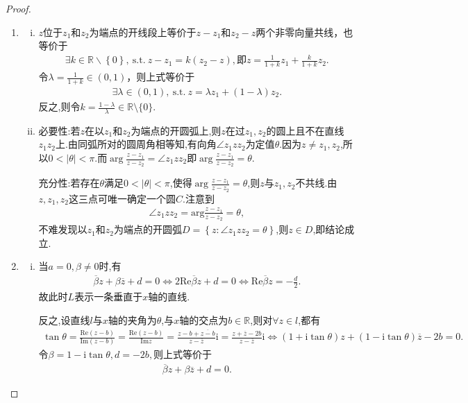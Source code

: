 \documentclass[../../main.tex]{subfiles}%
\begin{document}
\begin{proof}
\begin{enumerate}[(1)]
\item \begin{enumerate}[(i)]
\item $z$位于$z_1$和$z_2$为端点的开线段上等价于$z-z_1$和$z_2-z$两个非零向量共线，也等价于
\begin{align*}
\exists k\in \mathbb{R} \backslash \left\{ 0 \right\},\ \mathrm{s}.\mathrm{t}.\ z-z_1=k\left( z_2-z \right),\text{即}z=\frac{1}{1+k}z_1+\frac{k}{1+k}z_2.
\end{align*}
令$\lambda =\frac{1}{1+k}\in \left( 0,1 \right)$，则上式等价于
\begin{align*}
\exists \lambda \in \left( 0,1 \right),\ \mathrm{s}.\mathrm{t}.\ z=\lambda z_1+\left( 1-\lambda \right) z_2.
\end{align*}
反之,则令$k = \frac{1-\lambda}{\lambda}\in \mathbb{R}\setminus\{0\}$.

\item {\heiti 必要性:}若$z$在以$z_1$和$z_2$为端点的开圆弧上,则$z$在过$z_1,z_2$的圆上且不在直线$z_1z_2$上.由同弧所对的圆周角相等知,有向角$\angle z_1zz_2$为定值$\theta$.因为$z\neq z_1,z_2$,所以$0<\left| \theta \right|<\pi$.而$\arg\frac{z-z_1}{z-z_2}=\angle z_1zz_2$即$\arg\frac{z-z_1}{z-z_2}=\theta$.

{\heiti 充分性:}若存在$\theta$满足$0<\left| \theta \right|<\pi$,使得$\arg\frac{z-z_1}{z-z_2}=\theta$,则$z$与$z_1,z_2$不共线.由$z,z_1,z_2$这三点可唯一确定一个圆$C$.注意到
\begin{align*}
\angle z_1zz_2=\mathrm{arg}\frac{z-z_1}{z-z_2}=\theta,
\end{align*}
不难发现以$z_1$和$z_2$为端点的开圆弧$D=\left\{ z:\angle z_1zz_2=\theta \right\}$,则$z\in D$,即结论成立.
\end{enumerate}

\item \begin{enumerate}[(i)]
\item 当$a=0,\beta \ne 0$时,有
\begin{align*}
\overline{\beta }z+\beta \overline{z}+d=0\Longleftrightarrow 2\mathrm{Re}\overline{\beta }z+d=0\Longleftrightarrow \mathrm{Re}\overline{\beta }z=-\frac{d}{2}.
\end{align*}
故此时$L$表示一条垂直于$x$轴的直线.

反之,设直线$l$与$x$轴的夹角为$\theta$,与$x$轴的交点为$b\in \mathbb{R}$,则对$\forall z\in l$,都有
\begin{align*}
\tan \theta =\frac{\mathrm{Re}\left( z-b \right)}{\mathrm{Im}\left( z-b \right)}=\frac{\mathrm{Re}\left( z-b \right)}{\mathrm{Im}z}=\frac{z-b+\overline{z-b}}{z-\overline{z}}\mathrm{i}=\frac{z+\overline{z}-2b}{z-\overline{z}}\mathrm{i}\Longleftrightarrow \left( 1+\mathrm{i}\tan \theta \right) z+\left( 1-\mathrm{i}\tan \theta \right) \overline{z}-2b=0.
\end{align*}
令$\beta =1-\mathrm{i}\tan \theta ,d=-2b,$则上式等价于
\begin{align*}
\overline{\beta }z+\beta \overline{z}+d=0.
\end{align*}


\end{enumerate}
\end{enumerate}
\end{proof}
\end{document}

